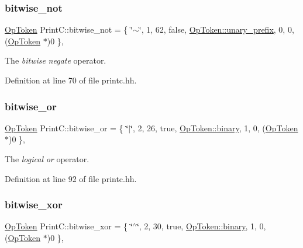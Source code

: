 \subsubsection{\texorpdfstring{bitwise\_not}{bitwise\_not}}
{\footnotesize\ttfamily \mbox{\hyperlink{class_op_token}{Op\+Token}} Print\+C\+::bitwise\+\_\+not = \{ \char`\"{}$\sim$\char`\"{}, 1, 62, false, \mbox{\hyperlink{class_op_token_af41c7f108d5662ede7765c5a6c44eaffa0d809c13f66611247b81856fc9e68289}{Op\+Token\+::unary\+\_\+prefix}}, 0, 0, (\mbox{\hyperlink{class_op_token}{Op\+Token}} $\ast$)0 \}\hspace{0.3cm}{\ttfamily [static]}, {\ttfamily [protected]}}



The {\itshape bitwise} {\itshape negate} operator. 



Definition at line 70 of file printc.\+hh.

\mbox{\label{class_print_c_ae8c841b464ec7c570db628387d17ba23}} 
\subsubsection{\texorpdfstring{bitwise\_or}{bitwise\_or}}
{\footnotesize\ttfamily \mbox{\hyperlink{class_op_token}{Op\+Token}} Print\+C\+::bitwise\+\_\+or = \{ \char`\"{}$\vert$\char`\"{}, 2, 26, true, \mbox{\hyperlink{class_op_token_af41c7f108d5662ede7765c5a6c44eaffa3a2ec63522a9329a71ddbe8adc3e752d}{Op\+Token\+::binary}}, 1, 0, (\mbox{\hyperlink{class_op_token}{Op\+Token}} $\ast$)0 \}\hspace{0.3cm}{\ttfamily [static]}, {\ttfamily [protected]}}



The {\itshape logical} {\itshape or} operator. 



Definition at line 92 of file printc.\+hh.

\mbox{\label{class_print_c_a78decc2f4f0fdfb6ddc0dd505e4ddc71}} 
\subsubsection{\texorpdfstring{bitwise\_xor}{bitwise\_xor}}
{\footnotesize\ttfamily \mbox{\hyperlink{class_op_token}{Op\+Token}} Print\+C\+::bitwise\+\_\+xor = \{ \char`\"{}$^\wedge$\char`\"{}, 2, 30, true, \mbox{\hyperlink{class_op_token_af41c7f108d5662ede7765c5a6c44eaffa3a2ec63522a9329a71ddbe8adc3e752d}{Op\+Token\+::binary}}, 1, 0, (\mbox{\hyperlink{class_op_token}{Op\+Token}} $\ast$)0 \}\hspace{0.3cm}{\ttfamily [static]}, {\ttfamily [protected]}}



